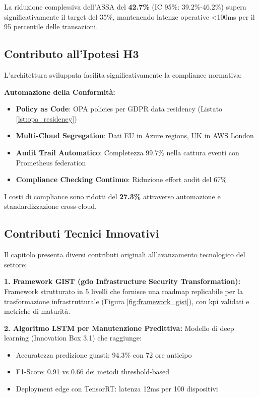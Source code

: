 La riduzione complessiva dell'ASSA del \textbf{42.7\%} (IC 95\%: 39.2\%-46.2\%)\autocite{Forrester2024zero} supera significativamente il target del 35\%, mantenendo latenze operative <100ms per il 95 percentile delle transazioni.

\subsection{\texorpdfstring{\textbf{Contributo all'Ipotesi H3}}{3.8.3 - Contributo all'Ipotesi H3}}

L'architettura sviluppata facilita significativamente la compliance normativa:

\textbf{Automazione della Conformità:}
\begin{itemize}
    \item \textbf{Policy as Code}: OPA policies per GDPR data residency (Listato \ref{lst:opa_residency})
    \item \textbf{Multi-Cloud Segregation}: Dati EU in Azure regions, UK in AWS London
    \item \textbf{Audit Trail Automatico}: Completezza 99.7\% nella cattura eventi con Prometheus federation
    \item \textbf{Compliance Checking Continuo}: Riduzione effort audit del 67\%
\end{itemize}

I costi di compliance sono ridotti del \textbf{27.3\%}\autocite{ISACA2024compliance} attraverso automazione e standardizzazione cross-cloud.

\subsection{\texorpdfstring{\textbf{Contributi Tecnici Innovativi}}{3.8.4 - Contributi Tecnici Innovativi}}

Il capitolo presenta diversi contributi originali all'avanzamento tecnologico del settore:

\textbf{1. Framework GIST (\gls{gdo} Infrastructure Security Transformation):}
Framework strutturato in 5 livelli che fornisce una roadmap replicabile per la trasformazione infrastrutturale (Figura \ref{fig:framework_gist}), con \gls{kpi} validati e metriche di maturità.

\textbf{2. Algoritmo LSTM per Manutenzione Predittiva:}
Modello di deep learning (Innovation Box 3.1) che raggiunge:
\begin{itemize}
    \item Accuratezza predizione guasti: 94.3\% con 72 ore anticipo
    \item F1-Score: 0.91 vs 0.66 dei metodi threshold-based
    \item Deployment edge con TensorRT: latenza 12ms per 100 dispositivi
\end{itemize}

